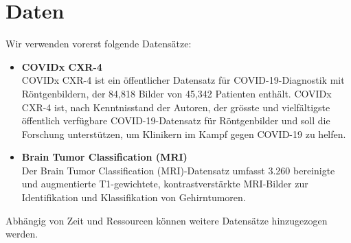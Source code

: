 \section{Daten}
Wir verwenden vorerst folgende Datensätze:

\begin{itemize}
    \item \textbf{COVIDx CXR-4} \\
    COVIDx CXR-4 \cite{wu_covidx_2023} ist ein öffentlicher Datensatz für COVID-19-Diagnostik mit Röntgenbildern, der 84,818 Bilder von 45,342 Patienten enthält. COVIDx CXR-4 ist, nach Kenntnisstand der Autoren, der grösste und vielfältigste öffentlich verfügbare COVID-19-Datensatz für Röntgenbilder und soll die Forschung unterstützen, um Klinikern im Kampf gegen COVID-19 zu helfen.
    
    \item \textbf{Brain Tumor Classification (MRI)} \\
    Der Brain Tumor Classification (MRI)-Datensatz \cite{bhuvaji_brain_2020} umfasst 3.260 bereinigte und augmentierte T1-gewichtete, kontrastverstärkte MRI-Bilder zur Identifikation und Klassifikation von Gehirntumoren.

\end{itemize}

Abhängig von Zeit und Ressourcen können weitere Datensätze hinzugezogen werden.

